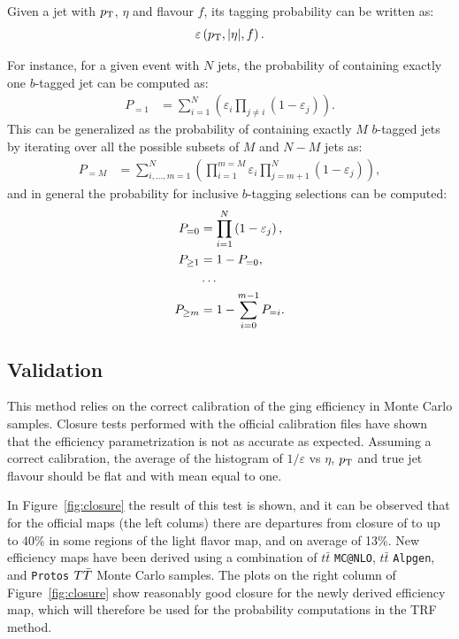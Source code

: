 Given a jet with $\pt$, $\eta$ and flavour $f$, its 
tagging probability can be written as:
\begin{equation}
	\varepsilon \left(\pt,|\eta|,f\right).
\end{equation}

For instance, for a given event with $N$ jets, the probability of 
containing exactly one $b$-tagged jet can be computed as:
\begin{align}
	P_{=1} &= \sum\limits_{i=1}^N \left( \varepsilon_{i} \prod\limits_{j \neq i} \left( 1 - \varepsilon_{j} \right) \right).\end{align}
This can be generalized as the probability of containing exactly $M$
$b$-tagged jets by iterating over all the possible subsets of $M$ and $N-M$
jets as:
\begin{align}
        P_{=M} &= \sum\limits_{i,\dots,m=1}^N 
        \left( 
        \prod\limits_{i=1}^{m=M} \varepsilon_{i}  
        \prod\limits_{j=m+1}^N \left( 1 - \varepsilon_{j} \right) 
        \right),
\end{align}
and in general the probability for inclusive $b$-tagging selections can be
computed:
\begin{align}
	P_{=0} &= \prod\limits_{i=1}^N \left( 1 - \varepsilon_{j} \right), \\
	P_{\geq 1} &= 1 - P_{=0},\\
&\dots \notag\\
	P_{\geq m} &= 1 - \sum\limits_{i=0}^{m-1} P_{=i}.
\end{align}

\subsection{Validation}
This method relies on the correct calibration of the \btag ging efficiency in 
Monte Carlo samples. 
Closure tests performed with the official calibration files have shown that 
the efficiency parametrization is not as accurate as expected.
Assuming a correct calibration, the average of the histogram of 
$1/\varepsilon$ vs $\eta$, $\pt$ and true jet flavour should be 
flat and with mean equal to one.

In Figure~\ref{fig:closure} the result of this test is shown, and it 
can be observed that for the official maps (the left colums) there 
are departures from closure of to up to 40\% in some regions of the light flavor
map, and on average of 13\%.
New efficiency maps have been derived using a combination 
of $t\bar{t}$ \texttt{MC@NLO}, $t\bar{t}$ \texttt{Alpgen}, and 
\texttt{Protos} $\TT$ Monte Carlo samples.
The plots on the right column of Figure~\ref{fig:closure} 
show reasonably good closure for the newly derived efficiency map,
which will therefore be used for the probability computations in the TRF method.

